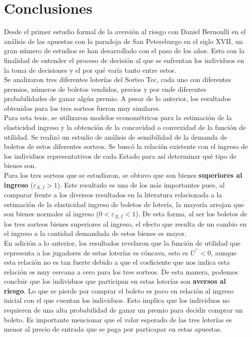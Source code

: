 \chapter*{Conclusiones}


\noindent Desde el primer estudio formal de la aversión al riesgo con Daniel Bernoulli en el análisis de las apuestas con la paradoja de San Petersburgo en el siglo XVII, un gran número de estudios se han desarrollado con el paso de los años. Esto con la finalidad de entender el proceso de decisión al que se enfrentan los individuos en la toma de decisiones y el por qué varía tanto entre estos. \\

Se analizaron tres diferentes loterías del Sorteo Tec, cada uno con diferentes premios, números de boletos vendidos, precios y por ende diferentes probabilidades de ganar algún premio. A pesar de lo anterior, los resultados obtenidos para los tres sorteos fueron muy similares. \\

Para esta tesis, se utilizaron modelos econométricos para la estimación de la elasticidad ingreso y la obtención de la concavidad o convexidad de la función de utilidad. Se realizó un estudio de análisis de sensibilidad de la demanda de boletos de estos diferentes sorteos. Se buscó la relación existente con el ingreso de los individuos representativos de cada Estado para así determinar qué tipo de bienes son. \\

Para los tres sorteos que se estudiaron, se obtuvo que son bienes \textbf{superiores al ingreso} ($\varepsilon_{X,I} > 1$). Este resultado es uno de los más importantes pues, al comparar frente a los diversos resultados en la literatura relacionada a la estimación de la elasticidad ingreso de boletos de lotería, la mayoría arrojan que son bienes normales al ingreso ($0 < \varepsilon_{X,I} < 1$). De esta forma, al ser los boletos de los tres sorteos bienes superiores al ingreso, el efecto que resulta de un cambio en el ingreso a la cantidad demandada de estos bienes es mayor. \\

En adición a lo anterior, los resultados revelaron que la función de utilidad que representa a los jugadores de estas loterías es cóncava, esto es $U^{\prime \prime} < 0$, aunque esta relación no es tan fuerte debido a que el coeficiente que nos indica esta relación es muy cercana a cero para los tres sorteos. De esta manera, podemos concluir que los individuos que participan en estas loterías son \textbf{aversos al riesgo}. Lo que se pierde por comprar el boleto es poco en relación al ingreso inicial con el que cuentan los individuos. Esto implica que los individuos no requieren de una alta probabilidad de ganar un premio para decidir comprar un boleto. Es importante mencionar que el valor esperado de las tres loterías es menor al precio de entrada que se paga por particapar en estas apuestas. \\ 

